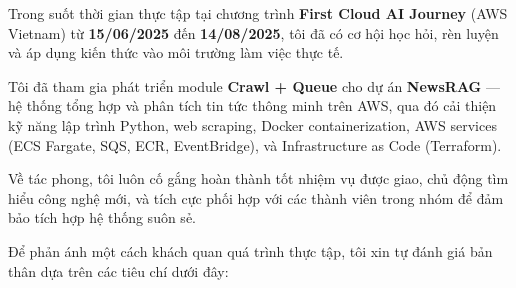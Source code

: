Trong suốt thời gian thực tập tại chương trình \textbf{First Cloud AI
Journey} (AWS Vietnam) từ \textbf{15/06/2025} đến \textbf{14/08/2025},
tôi đã có cơ hội học hỏi, rèn luyện và áp dụng kiến thức vào môi trường
làm việc thực tế.

Tôi đã tham gia phát triển module \textbf{Crawl + Queue} cho dự án
\textbf{NewsRAG} --- hệ thống tổng hợp và phân tích tin tức thông minh
trên AWS, qua đó cải thiện kỹ năng lập trình Python, web scraping,
Docker containerization, AWS services (ECS Fargate, SQS, ECR,
EventBridge), và Infrastructure as Code (Terraform).

Về tác phong, tôi luôn cố gắng hoàn thành tốt nhiệm vụ được giao, chủ
động tìm hiểu công nghệ mới, và tích cực phối hợp với các thành viên
trong nhóm để đảm bảo tích hợp hệ thống suôn sẻ.

Để phản ánh một cách khách quan quá trình thực tập, tôi xin tự đánh giá
bản thân dựa trên các tiêu chí dưới đây:

